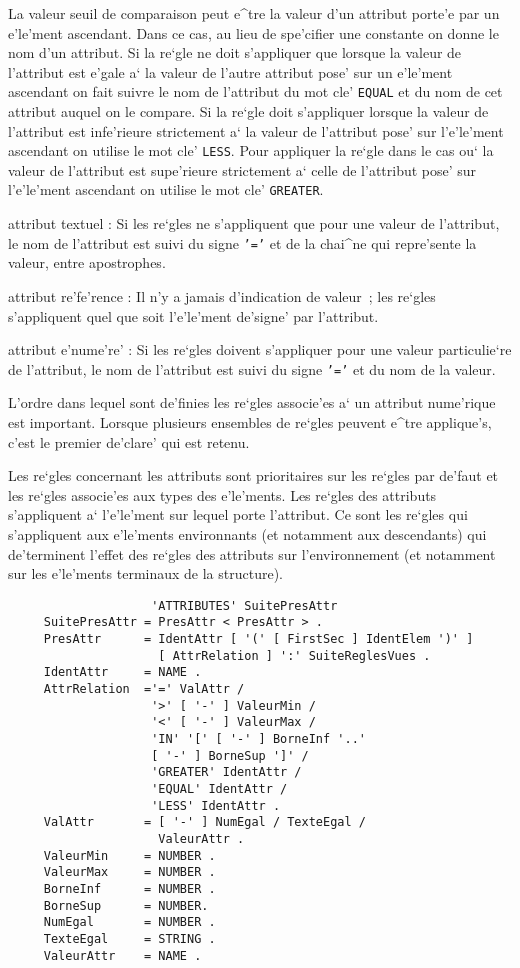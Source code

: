 {\begin{description}
La valeur seuil de comparaison peut e^tre la valeur d'un attribut
porte'e par un e'le'ment ascendant. Dans ce cas, au lieu de spe'cifier une
constante on donne le nom d'un attribut. Si la re`gle ne doit
s'appliquer que lorsque la valeur de l'attribut est e'gale a` la
valeur de l'autre attribut pose' sur un e'le'ment ascendant on fait
suivre le nom de l'attribut du mot cle' {\tt EQUAL} et du nom de cet
attribut auquel on le compare.
Si la re`gle doit s'appliquer lorsque la valeur de l'attribut est
infe'rieure strictement a` la
valeur de l'attribut pose' sur l'e'le'ment ascendant on utilise le mot cle'
{\tt LESS}. 
Pour appliquer la re`gle dans le cas ou` la valeur de l'attribut est
supe'rieure strictement a` celle de l'attribut pose' sur l'e'le'ment ascendant on
utilise le mot cle' {\tt GREATER}.
\item{attribut textuel :}
Si les re`gles ne s'appliquent que pour une valeur de l'attribut, le nom
de l'attribut est suivi du signe {\tt '='} et de la chai^ne qui repre'sente
la valeur, entre apostrophes.
\item{attribut re'fe'rence :}
Il n'y a jamais d'indication de valeur~; les re`gles s'appliquent quel que soit
l'e'le'ment de'signe' par l'attribut.
\item{attribut e'nume're' :}
Si les re`gles doivent s'appliquer pour une valeur particulie`re de l'attribut,
le nom de l'attribut est suivi du signe {\tt '='} et du nom de la valeur.
\end{description}

L'ordre dans lequel sont de'finies les re`gles associe'es a` un attribut
nume'rique est important. Lorsque plusieurs ensembles de re`gles peuvent e^tre
applique's, c'est le premier de'clare' qui est retenu.

Les re`gles concernant les attributs sont prioritaires sur les re`gles par
de'faut et les re`gles associe'es aux types des e'le'ments. Les re`gles des
attributs s'appliquent a` l'e'le'ment sur lequel porte l'attribut. Ce sont les
re`gles qui s'appliquent aux e'le'ments environnants (et notamment aux
descendants) qui de'terminent l'effet des re`gles des attributs sur
l'environnement (et notamment sur les e'le'ments terminaux de la structure).

\begin{verbatim}
                    'ATTRIBUTES' SuitePresAttr
     SuitePresAttr = PresAttr < PresAttr > .
     PresAttr      = IdentAttr [ '(' [ FirstSec ] IdentElem ')' ]
                     [ AttrRelation ] ':' SuiteReglesVues .
     IdentAttr     = NAME .
     AttrRelation  ='=' ValAttr /
                    '>' [ '-' ] ValeurMin /
                    '<' [ '-' ] ValeurMax /
                    'IN' '[' [ '-' ] BorneInf '..'
                    [ '-' ] BorneSup ']' /
                    'GREATER' IdentAttr /
                    'EQUAL' IdentAttr /
                    'LESS' IdentAttr .
     ValAttr       = [ '-' ] NumEgal / TexteEgal /
                     ValeurAttr .
     ValeurMin     = NUMBER .
     ValeurMax     = NUMBER .
     BorneInf      = NUMBER .
     BorneSup      = NUMBER.
     NumEgal       = NUMBER .
     TexteEgal     = STRING .
     ValeurAttr    = NAME .
\end{verbatim}

}
